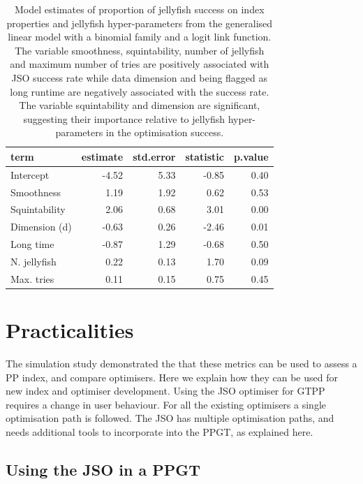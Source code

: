 \documentclass[
  12pt,
]{interact}
\theoremstyle{plain}
\begin{document}
\hypertarget{tbl-mod-output}{}
\begin{table}
\caption{\label{tbl-mod-output}Model estimates of proportion of jellyfish success on index properties
and jellyfish hyper-parameters from the generalised linear model with a
binomial family and a logit link function. The variable smoothness,
squintability, number of jellyfish and maximum number of tries are
positively associated with JSO success rate while data dimension and
being flagged as long runtime are negatively associated with the success
rate. The variable squintability and dimension are significant,
suggesting their importance relative to jellyfish hyper-parameters in
the optimisation success. }\tabularnewline

\centering\begingroup\fontsize{10}{12}\selectfont

\begin{tabular}{|>{}lrrr>{}r|}
\toprule
term & estimate & std.error & statistic & p.value\\
\midrule
Intercept & -4.52 & 5.33 & -0.85 & 0.40\\
Smoothness & 1.19 & 1.92 & 0.62 & 0.53\\
Squintability & 2.06 & 0.68 & 3.01 & 0.00\\
Dimension (d) & -0.63 & 0.26 & -2.46 & 0.01\\
Long time & -0.87 & 1.29 & -0.68 & 0.50\\
N. jellyfish & 0.22 & 0.13 & 1.70 & 0.09\\
Max. tries & 0.11 & 0.15 & 0.75 & 0.45\\
\bottomrule
\end{tabular}
\endgroup{}
\end{table}

\hypertarget{sec-discussion}{%
\section{Practicalities}\label{sec-discussion}}

The simulation study demonstrated the that these metrics can be used to
assess a PP index, and compare optimisers. Here we explain how they can
be used for new index and optimiser development. Using the JSO optimiser
for GTPP requires a change in user behaviour. For all the existing
optimisers a single optimisation path is followed. The JSO has multiple
optimisation paths, and needs additional tools to incorporate into the
PPGT, as explained here.

\hypertarget{using-the-jso-in-a-ppgt}{%
\subsection{Using the JSO in a PPGT}\label{using-the-jso-in-a-ppgt}}
\end{document}
